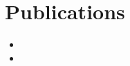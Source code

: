 \chapter*{Publications}

\begin{itemize}[leftmargin=0pt]
    \item[\cite{rockafellar1970convex}] 
    \item[\cite{boyd2004convex}] 
\end{itemize}
